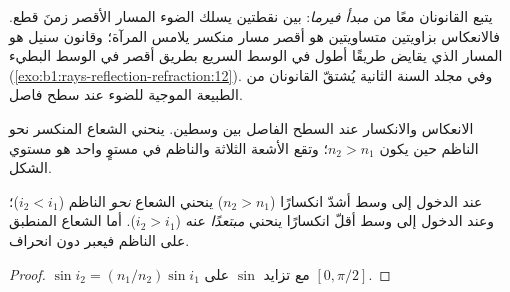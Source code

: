 \begin{remark}\label{rem:b1:rays-reflection-refraction:fermat}
يتبع القانونان معًا من \emph{مبدأ فيرما}: بين نقطتين يسلك الضوء المسار
الأقصر زمنَ قطع. فالانعكاس بزاويتين متساويتين هو أقصر مسار منكسر يلامس
المرآة؛ وقانون سنيل هو المسار الذي يقايض طريقًا أطول في الوسط السريع
بطريق أقصر في الوسط البطيء
(\cref{exo:b1:rays-reflection-refraction:12}). وفي مجلد السنة الثانية
يُشتقّ القانونان من الطبيعة الموجية للضوء عند سطح فاصل.
\end{remark}

\begin{omfigure}

{\small الانعكاس والانكسار عند السطح الفاصل بين وسطين. ينحني الشعاع
المنكسر نحو الناظم حين يكون $n_2 > n_1$؛ وتقع الأشعة الثلاثة والناظم
في مستوٍ واحد هو مستوي الشكل.}
\end{omfigure}

\begin{proposition}\label{prop:b1:rays-reflection-refraction:bending}
عند الدخول إلى وسط أشدّ انكسارًا ($n_2 > n_1$) ينحني الشعاع
\emph{نحو} الناظم ($i_2 < i_1$)؛ وعند الدخول إلى وسط أقلّ انكسارًا
ينحني \emph{مبتعدًا} عنه ($i_2 > i_1$). أما الشعاع المنطبق على الناظم
فيعبر دون انحراف.
\end{proposition}

\begin{proof}
$\sin i_2 = (n_1/n_2)\sin i_1$ مع تزايد $\sin$ على
$[0, \pi/2]$.
\end{proof}

